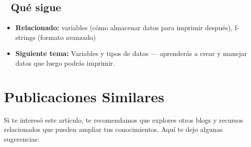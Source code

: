 \documentclass[
  doc,
  floatsintext,
  longtable,
  a4paper,
  nolmodern,
  notxfonts,
  notimes,
  12pt,
  colorlinks=true,linkcolor=blue,citecolor=blue,urlcolor=blue]{apa7}
\providecommand{\tightlist}{%
  \setlength{\itemsep}{0pt}\setlength{\parskip}{0pt}}
\begin{document}
\subsection{🔗 Qué sigue}\label{quuxe9-sigue}

\begin{itemize}
\tightlist
\item
  \textbf{Relacionado:} variables (cómo almacenar datos para imprimir
  después), f-strings (formato avanzado)
\item
  \textbf{Siguiente tema:} Variables y tipos de datos --- aprenderás a
  crear y manejar datos que luego podrás imprimir.
\end{itemize}

\section{Publicaciones Similares}\label{publicaciones-similares}

Si te interesó este artículo, te recomendamos que explores otros blogs y
recursos relacionados que pueden ampliar tus conocimientos. Aquí te dejo
algunas sugerencias:
\end{document}
